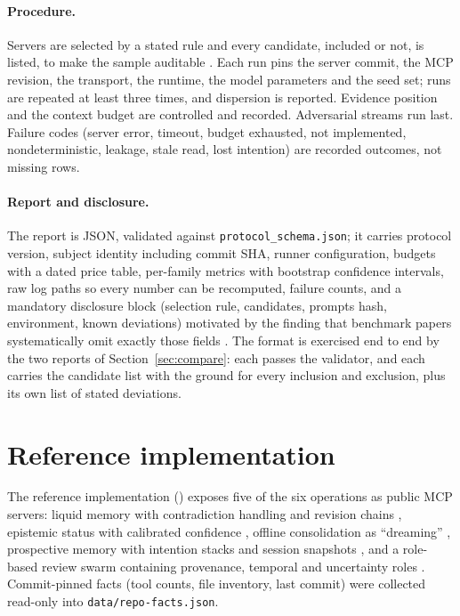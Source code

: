 \documentclass[11pt,a4paper]{article}
\begin{document}
\paragraph{Procedure.} Servers are selected by a stated rule and every candidate, included or
not, is listed, to make the sample auditable \cite{afsar2026registry}. Each run pins the server
commit, the MCP revision, the transport, the runtime, the model parameters and the seed set;
runs are repeated at least three times, and dispersion is reported. Evidence position
\cite{liu2023lostmiddle,hseih2024foundmiddle} and the context budget \cite{xu2026contextpipe}
are controlled and recorded. Adversarial streams run last. Failure codes (server error,
timeout, budget exhausted, not implemented, nondeterministic, leakage, stale read, lost
intention) are recorded outcomes, not missing rows.

\paragraph{Report and disclosure.} The report is JSON, validated against
\texttt{protocol\_schema.json}; it carries protocol version, subject identity including commit
SHA, runner configuration, budgets with a dated price table, per-family metrics with bootstrap
confidence intervals, raw log paths so every number can be recomputed, failure counts, and a
mandatory disclosure block (selection rule, candidates, prompts hash, environment, known
deviations) motivated by the finding that benchmark papers systematically omit exactly those
fields \cite{moghadasi2026disclose}. The format is exercised end to end by the two reports of
Section~\ref{sec:compare}: each passes the validator, and each carries the candidate list with
the ground for every inclusion and exclusion, plus its own list of stated deviations.

\section{Reference implementation}
\label{sec:impl}

The reference implementation (\cite{sintrepo}) exposes five of the six operations as public MCP
servers: liquid memory with contradiction handling and revision chains \cite{sintliquid},
epistemic status with calibrated confidence \cite{sintepistemic}, offline consolidation as
``dreaming'' \cite{sintdream}, prospective memory with intention stacks and session snapshots
\cite{sintprospective}, and a role-based review swarm containing provenance, temporal and
uncertainty roles \cite{sintswarm}. Commit-pinned facts (tool counts, file inventory, last
commit) were collected read-only into \texttt{data/repo-facts.json}.
\end{document}
